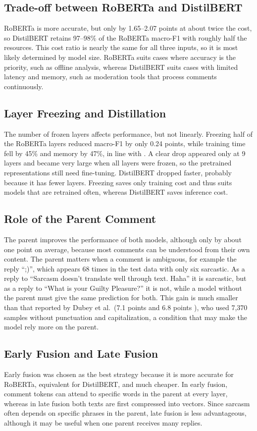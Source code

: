 \documentclass[conference]{IEEEtran}
\begin{document}
\subsection{Trade-off between RoBERTa and DistilBERT}
RoBERTa is more accurate, but only by 1.65--2.07 points at about twice the cost, so DistilBERT retains 97--98\% of the RoBERTa macro-F1 with roughly half the resources. This cost ratio is nearly the same for all three inputs, so it is most likely determined by model size. RoBERTa suits cases where accuracy is the priority, such as offline analysis, whereas DistilBERT suits cases with limited latency and memory, such as moderation tools that process comments continuously.

\subsection{Layer Freezing and Distillation}
The number of frozen layers affects performance, but not linearly. Freezing half of the RoBERTa layers reduced macro-F1 by only 0.24 points, while training time fell by 45\% and memory by 47\%, in line with \cite{ardakani2024slimfit}. A clear drop appeared only at 9 layers and became very large when all layers were frozen, so the pretrained representations still need fine-tuning. DistilBERT dropped faster, probably because it has fewer layers. Freezing saves only training cost and thus suits models that are retrained often, whereas DistilBERT saves inference cost.

\subsection{Role of the Parent Comment}
The parent improves the performance of both models, although only by about one point on average, because most comments can be understood from their own content. The parent matters when a comment is ambiguous, for example the reply ``;)'', which appears 68 times in the test data with only six sarcastic. As a reply to ``Sarcasm doesn't translate well through text. Haha'' it is sarcastic, but as a reply to ``What is your Guilty Pleasure?'' it is not, while a model without the parent must give the same prediction for both. This gain is much smaller than that reported by Dubey et al.\ (7.1 points \cite{dubey2026efficient} and 6.8 points \cite{dubey2025unpacking}), who used 7,370 samples without punctuation and capitalization, a condition that may make the model rely more on the parent.

\subsection{Early Fusion and Late Fusion}
Early fusion was chosen as the best strategy because it is more accurate for RoBERTa, equivalent for DistilBERT, and much cheaper. In early fusion, comment tokens can attend to specific words in the parent at every layer, whereas in late fusion both texts are first compressed into vectors. Since sarcasm often depends on specific phrases in the parent, late fusion is less advantageous, although it may be useful when one parent receives many replies.
\end{document}
